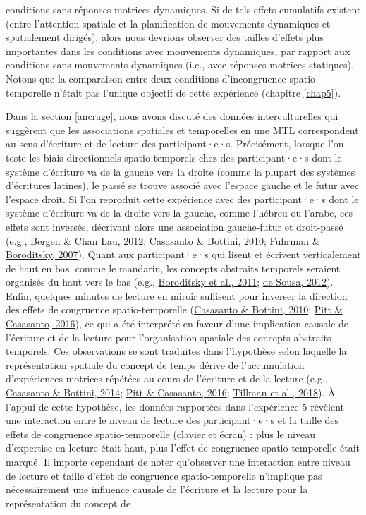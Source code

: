\documentclass[
  a4paper,12pt,twoside,onecolumn,openright,final,oldfontcommands]{memoir}
\begin{document}
conditions sans réponses motrices dynamiques. Si de tels effets cumulatifs existent (entre l'attention spatiale et la planification de mouvements dynamiques et spatialement dirigés), alors nous devrions observer des tailles d'effets plus importantes dans les conditions avec mouvements dynamiques, par rapport aux conditions sans mouvements dynamiques (i.e., avec réponses motrices statiques). Notons que la comparaison entre deux conditions d'incongruence spatio-temporelle n'était pas l'unique objectif de cette expérience (chapitre \ref{chap5}).

Dans la section \ref{ancrage}, nous avons discuté des données interculturelles qui suggèrent que les associations spatiales et temporelles en une MTL correspondent au sens d'écriture et de lecture des participant·e·s. Précisément, lorsque l'on teste les biais directionnels spatio-temporels chez des participant·e·s dont le système d'écriture va de la gauche vers la droite (comme la plupart des systèmes d'écritures latines), le passé se trouve associé avec l'espace gauche et le futur avec l'espace droit. Si l'on reproduit cette expérience avec des participant·e·s dont le système d'écriture va de la droite vers la gauche, comme l'hébreu ou l'arabe, ces effets sont inversés, décrivant alors une association gauche-futur et droit-passé (e.g., \protect\hyperlink{ref-bergen_writing_2012}{Bergen \& Chan Lau, 2012}; \protect\hyperlink{ref-hutchison_can_2010}{Casasanto \& Bottini, 2010}; \protect\hyperlink{ref-fuhrman_mental_2007}{Fuhrman \& Boroditsky, 2007}). Quant aux participant·e·s qui lisent et écrivent verticalement de haut en bas, comme le mandarin, les concepts abstraits temporels seraient organisés du haut vers le bas (e.g., \protect\hyperlink{ref-boroditsky_english_2011}{Boroditsky et al., 2011}; \protect\hyperlink{ref-de_sousa_generational_2012}{de Sousa, 2012}). Enfin, quelques minutes de lecture en miroir suffisent pour inverser la direction des effets de congruence spatio-temporelle (\protect\hyperlink{ref-hutchison_can_2010}{Casasanto \& Bottini, 2010}; \protect\hyperlink{ref-pitt_reading_2016}{Pitt \& Casasanto, 2016}), ce qui a été interprété en faveur d'une implication causale de l'écriture et de la lecture pour l'organisation spatiale des concepts abstraits temporels. Ces observations se sont traduites dans l'hypothèse selon laquelle la représentation spatiale du concept de temps dérive de l'accumulation d'expériences motrices répétées au cours de l'écriture et de la lecture (e.g., \protect\hyperlink{ref-casasanto_spatial_2014}{Casasanto \& Bottini, 2014}; \protect\hyperlink{ref-pitt_reading_2016}{Pitt \& Casasanto, 2016}; \protect\hyperlink{ref-tillman_mental_2018}{Tillman et al., 2018}). À l'appui de cette hypothèse, les données rapportées dans l'expérience 5 révèlent une interaction entre le niveau de lecture des participant·e·s et la taille des effets de congruence spatio-temporelle (clavier et écran) : plus le niveau d'expertise en lecture était haut, plus l'effet de congruence spatio-temporelle était marqué. Il importe cependant de noter qu'observer une interaction entre niveau de lecture et taille d'effet de congruence spatio-temporelle n'implique pas nécessairement une influence causale de l'écriture et la lecture pour la représentation du concept de 
\end{document}
